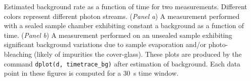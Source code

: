 \label{fig:bg_timetrace} Estimated background rate as a function of time for two \usalex measurements. Different colors represent different photon streams. (\textit{Panel a}) A measurement performed with a sealed sample chamber exhibiting constant a background as a function of time. (\textit{Panel b}) A measurement performed on an unsealed sample exhibiting significant background variations due to sample evaporation and/or photo-bleaching (likely of impurities the cover-glass). 
These plots are produced by the command
\texttt{dplot(d, timetrace\_bg)} after estimation of background.
Each data point in these figures is computed for a 30~s time window.

